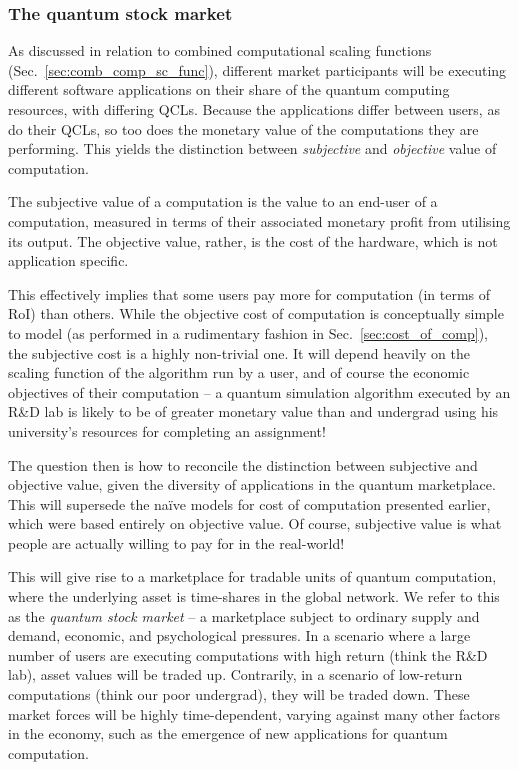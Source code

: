 %
%

\subsubsection{The quantum stock market}

As discussed in relation to combined computational scaling functions (Sec.~\ref{sec:comb_comp_sc_func}), different market participants will be executing different software applications on their share of the quantum computing resources, with differing QCLs. Because the applications differ between users, as do their QCLs, so too does the monetary value of the computations they are performing. This yields the distinction between \textit{subjective} and \textit{objective} value of computation.

The subjective value of a computation is the value to an end-user of a computation, measured in terms of their associated monetary profit from utilising its output. The objective value, rather, is the cost of the hardware, which is not application specific.

This effectively implies that some users pay more for computation (in terms of RoI) than others. While the objective cost of computation is conceptually simple to model (as performed in a rudimentary fashion in Sec.~\ref{sec:cost_of_comp}), the subjective cost is a highly non-trivial one. It will depend heavily on the scaling function of the algorithm run by a user, and of course the economic objectives of their computation -- a quantum simulation algorithm executed by an R\&D lab is likely to be of greater monetary value than and undergrad using his university's resources for completing an assignment!

The question then is how to reconcile the distinction between subjective and objective value, given the diversity of applications in the quantum marketplace. This will supersede the na\"ive models for cost of computation presented earlier, which were based entirely on objective value. Of course, subjective value is what people are actually willing to pay for in the real-world!

This will give rise to a marketplace for tradable units of quantum computation, where the underlying asset is time-shares in the global network. We refer to this as the \textit{quantum stock market} -- a marketplace subject to ordinary supply and demand, economic, and psychological pressures. In a scenario where a large number of users are executing computations with high return (think the R\&D lab), asset values will be traded up. Contrarily, in a scenario of low-return computations (think our poor undergrad), they will be traded down. These market forces will be highly time-dependent, varying against many other factors in the economy, such as the emergence of new applications for quantum computation.


